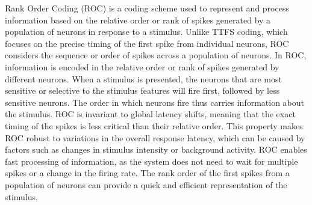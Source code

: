 \documentclass{article}
\begin{document}
Rank Order Coding (ROC) \cite{thorpe1998rank} is a coding scheme used to represent and process information based on the relative order or rank of spikes generated by a population of neurons in response to a stimulus. Unlike TTFS coding, which focuses on the precise timing of the first spike from individual neurons, ROC considers the sequence or order of spikes across a population of neurons. In ROC, information is encoded in the relative order or rank of spikes generated by different neurons. When a stimulus is presented, the neurons that are most sensitive or selective to the stimulus features will fire first, followed by less sensitive neurons. The order in which neurons fire thus carries information about the stimulus. ROC is invariant to global latency shifts, meaning that the exact timing of the spikes is less critical than their relative order. This property makes ROC robust to variations in the overall response latency, which can be caused by factors such as changes in stimulus intensity or background activity. ROC enables fast processing of information, as the system does not need to wait for multiple spikes or a change in the firing rate. The rank order of the first spikes from a population of neurons can provide a quick and efficient representation of the stimulus.



\end{document}
